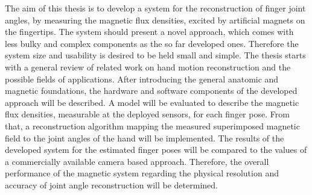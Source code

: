 The aim of this thesis is to develop a system for the reconstruction of finger joint angles, by measuring the magnetic flux densities, excited by artificial magnets on the fingertips. The system should present a novel approach, which comes with less bulky and complex components as the so far developed ones. Therefore the system size and usability is desired to be held small and simple. The thesis starts with a general review of related work on hand motion reconstruction and the possible fields of applications. After introducing the general anatomic and magnetic foundations, the hardware and software components of the developed approach will be described. A model will be evaluated to describe the magnetic flux densities, measurable at the deployed sensors, for each finger pose. From that, a reconstruction algorithm mapping the measured superimposed magnetic field to the joint angles of the hand will be implemented. The results of the developed system for the estimated finger poses will be compared to the values of a commercially available camera based approach. Therefore, the overall performance of the magnetic system regarding the physical resolution and accuracy of joint angle reconstruction will be determined. 




